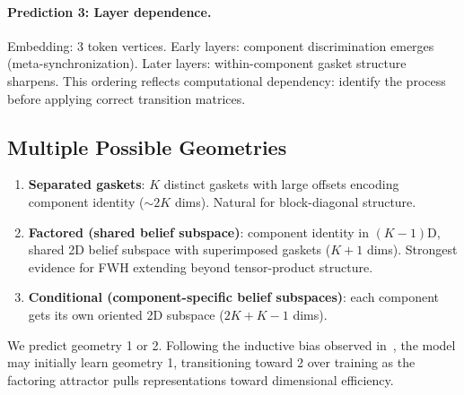 \paragraph{Prediction 3: Layer dependence.} Embedding: 3 token vertices. Early layers: component discrimination emerges (meta-synchronization). Later layers: within-component gasket structure sharpens. This ordering reflects computational dependency: identify the process before applying correct transition matrices.

\subsection{Multiple Possible Geometries}

\begin{enumerate}
    \item \textbf{Separated gaskets}: $K$ distinct gaskets with large offsets encoding component identity ($\sim 2K$ dims). Natural for block-diagonal structure.
    \item \textbf{Factored (shared belief subspace)}: component identity in $(K{-}1)$D, shared 2D belief subspace with superimposed gaskets ($K{+}1$ dims). Strongest evidence for FWH extending beyond tensor-product structure.
    \item \textbf{Conditional (component-specific belief subspaces)}: each component gets its own oriented 2D subspace ($2K{+}K{-}1$ dims).
\end{enumerate}

We predict geometry 1 or 2. Following the inductive bias observed in~\cite{shai2026factored}, the model may initially learn geometry 1, transitioning toward 2 over training as the factoring attractor pulls representations toward dimensional efficiency.
